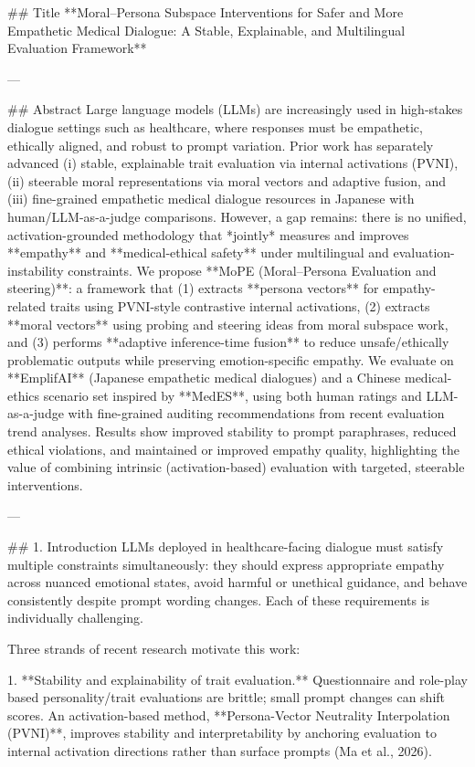 ## Title  
**Moral–Persona Subspace Interventions for Safer and More Empathetic Medical Dialogue: A Stable, Explainable, and Multilingual Evaluation Framework**

---

## Abstract  
Large language models (LLMs) are increasingly used in high-stakes dialogue settings such as healthcare, where responses must be empathetic, ethically aligned, and robust to prompt variation. Prior work has separately advanced (i) stable, explainable trait evaluation via internal activations (PVNI), (ii) steerable moral representations via moral vectors and adaptive fusion, and (iii) fine-grained empathetic medical dialogue resources in Japanese with human/LLM-as-a-judge comparisons. However, a gap remains: there is no unified, activation-grounded methodology that *jointly* measures and improves **empathy** and **medical-ethical safety** under multilingual and evaluation-instability constraints.  
We propose **MoPE (Moral–Persona Evaluation and steering)**: a framework that (1) extracts **persona vectors** for empathy-related traits using PVNI-style contrastive internal activations, (2) extracts **moral vectors** using probing and steering ideas from moral subspace work, and (3) performs **adaptive inference-time fusion** to reduce unsafe/ethically problematic outputs while preserving emotion-specific empathy. We evaluate on **EmplifAI** (Japanese empathetic medical dialogues) and a Chinese medical-ethics scenario set inspired by **MedES**, using both human ratings and LLM-as-a-judge with fine-grained auditing recommendations from recent evaluation trend analyses. Results show improved stability to prompt paraphrases, reduced ethical violations, and maintained or improved empathy quality, highlighting the value of combining intrinsic (activation-based) evaluation with targeted, steerable interventions.

---

## 1. Introduction  
LLMs deployed in healthcare-facing dialogue must satisfy multiple constraints simultaneously: they should express appropriate empathy across nuanced emotional states, avoid harmful or unethical guidance, and behave consistently despite prompt wording changes. Each of these requirements is individually challenging.

Three strands of recent research motivate this work:

1. **Stability and explainability of trait evaluation.** Questionnaire and role-play based personality/trait evaluations are brittle; small prompt changes can shift scores. An activation-based method, **Persona-Vector Neutrality Interpolation (PVNI)**, improves stability and interpretability by anchoring evaluation to internal activation directions rather than surface prompts (Ma et al., 2026).

